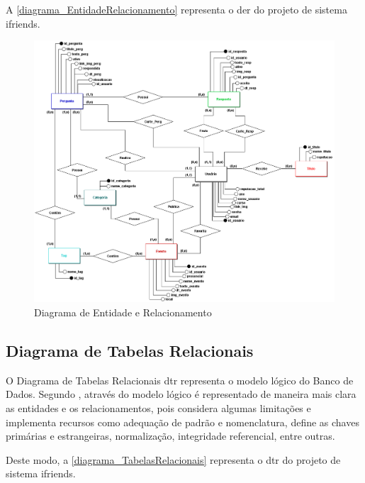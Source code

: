 A \autoref{diagrama_EntidadeRelacionamento} representa o \ac{der} do projeto de sistema \gls{ifriends}.

\begin{figure}[htb]
\centering
\caption{Diagrama de Entidade e Relacionamento}
\label{diagrama_EntidadeRelacionamento}
\includegraphics[width=1.0\textwidth]{anexos/Imagens_Diagramas/DER_IFriends.png}
\end{figure}
\FloatBarrier


\subsection{Diagrama de Tabelas Relacionais}

O Diagrama de Tabelas Relacionais \acs{dtr} representa o modelo lógico do Banco de Dados. Segundo , através do modelo lógico é representado de maneira mais clara as entidades e os relacionamentos, pois considera algumas limitações e implementa recursos como adequação de padrão e nomenclatura, define as chaves primárias e estrangeiras, normalização, integridade referencial, entre outras.

Deste modo, a \autoref{diagrama_TabelasRelacionais} representa o \ac{dtr} do projeto de sistema \gls{ifriends}.

